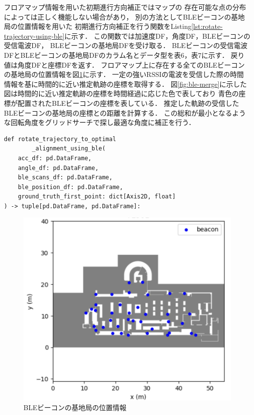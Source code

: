 フロアマップ情報を用いた初期進行方向補正ではマップの
存在可能な点の分布によっては正しく機能しない場合があり，
別の方法としてBLEビーコンの基地局の位置情報を用いた
初期進行方向補正を行う関数をListing\ref{lst:rotate-trajectory-using-ble}に示す．
この関数では加速度DF，角度DF，BLEビーコンの受信電波DF， BLEビーコンの基地局DFを受け取る．
BLEビーコンの受信電波DFとBLEビーコンの基地局DFのカラム名とデータ型を表6，表7に示す．
戻り値は角度DFと座標DFを返す．
フロアマップ上に存在する全てのBLEビーコンの基地局の位置情報を図\ref{fig:ble-beacon-position}に示す．
一定の強いRSSIの電波を受信した際の時間情報を基に時間的に近い推定軌跡の座標を取得する．
図\ref{fig:ble-merge}に示した図は時間的に近い推定軌跡の座標を時間経過に応じた色で表しており
青色の座標が配置されたBLEビーコンの座標を表している．
推定した軌跡の受信したBLEビーコンの基地局の座標との距離を計算する．
この総和が最小となるような回転角度をグリッドサーチで探し最適な角度に補正を行う．

\begin{lstlisting}[caption={BLEビーコンの基地局の位置情報を\\使用した初期進行方向補正}, label=lst:rotate-trajectory-using-ble]
def rotate_trajectory_to_optimal
		_alignment_using_ble(
    acc_df: pd.DataFrame,
    angle_df: pd.DataFrame,
    ble_scans_df: pd.DataFrame,
    ble_position_df: pd.DataFrame,
    ground_truth_first_point: dict[Axis2D, float]
) -> tuple[pd.DataFrame, pd.DataFrame]:
\end{lstlisting}


\begin{figure}[ht]
	\centering
	\includegraphics[width=\linewidth]{image/ble-beacon-position.jpg}
	\caption{BLEビーコンの基地局の位置情報}    \label{fig:ble-beacon-position}
\end{figure}

